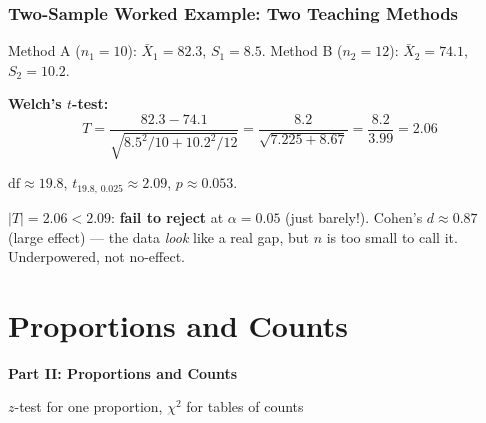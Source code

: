 \documentclass[aspectratio=169]{beamer}
\begin{document}
\begin{frame}
\frametitle{Two-Sample Worked Example: Two Teaching Methods}

\small
Method A ($n_1 = 10$): $\bar{X}_1 = 82.3$, $S_1 = 8.5$. \quad
Method B ($n_2 = 12$): $\bar{X}_2 = 74.1$, $S_2 = 10.2$.

\vspace{0.1cm}
\textbf{Welch's $t$-test:}
$$T = \frac{82.3 - 74.1}{\sqrt{8.5^2/10 + 10.2^2/12}} = \frac{8.2}{\sqrt{7.225 + 8.67}} = \frac{8.2}{3.99} = 2.06$$

$\text{df} \approx 19.8$, \;$t_{19.8,\, 0.025} \approx 2.09$, \;$p \approx 0.053$.

\vspace{0.1cm}
\begin{center}
\end{center}

\vspace{0.05cm}
$|T| = 2.06 < 2.09$: \textbf{fail to reject} at $\alpha = 0.05$ (just barely!).
Cohen's $d \approx 0.87$ (large effect) --- the data \emph{look} like a real gap, but $n$ is too small to call it. Underpowered, not no-effect.
\end{frame}

\section{Proportions and Counts}

\begin{frame}
\begin{center}
  \vspace{1.5cm}
  {\Huge\bfseries\textcolor{popblue}{Part II: Proportions and Counts}}

  \vspace{0.8cm}
  {\large $z$-test for one proportion, $\chi^2$ for tables of counts}
\end{center}
\end{frame}
\end{document}
